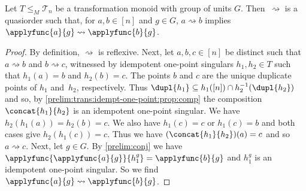\begin{lemma}
	\label{sync_max:lem:idempotent_quasiorder}
	Let $T \le_M \mathcal T_n$ be a transformation monoid with group of units $G$.
	Then~$\rightsquigarrow$ is a quasiorder
	such that, for $a,b \in [n]$ and $g \in G$,
	$a \rightsquigarrow b$
	implies $\applyfunc{a}{g} \rightsquigarrow \applyfunc{b}{g}$.
\end{lemma}
\begin{proof}
	By definition, $\rightsquigarrow$ is reflexive.
	Next, let $a,b,c \in [n]$
	be distinct such that $a \rightsquigarrow b$
	and $b \rightsquigarrow c$,	witnessed by idempotent one-point singulars
	$h_1, h_2 \in T$ 
	such that $h_1(a) = b$
	and $h_2(b) = c$.
	The points $b$ and $c$ are the unique duplicate points of $h_1$ and~$h_2$, respectively.
	Thus $\dupl{h_1} \subseteq h_1([n]) \cap h_2^{-1}(\dupl{h_2})$
	and so, by \cref{prelim:trans:idempt-one-point:prop:comp}
	the composition $\concat{h_1}{h_2}$
	is an idempotent one-point singular.
	We have $h_2(h_1(a)) = h_2(b) = c$.
	We also have $h_1(c) = c$
	or $h_1(c) = b$ and both cases give $h_2(h_1(c)) = c$.
	Thus we have $(\concat{h_1}{h_2})(a) = c$
	and so $a \rightsquigarrow c$. 
	Next, let $g \in G$.
	By \cref{prelim:conj}
	we have $\applyfunc{\applyfunc{a}{g}}{h_1^g} = \applyfunc{b}{g}$
	and $h_1^g$ is an idempotent
	one-point singular.
	So we find $\applyfunc{a}{g} \rightsquigarrow  \applyfunc{b}{g}$.
\end{proof}

